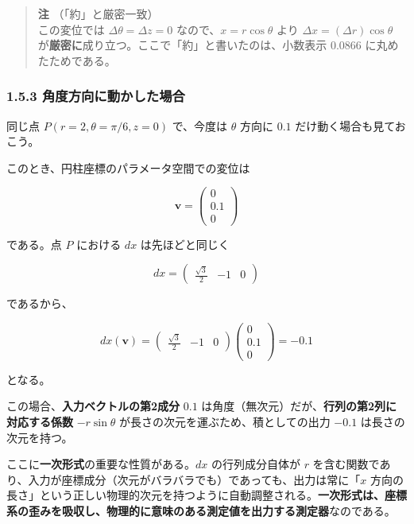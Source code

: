 \documentclass[a4paper,12pt,openany]{book}
\begin{document}
\begin{quote}
\textbf{注} （「約」と厳密一致）\\
この変位では \(\Delta\theta=\Delta z=0\) なので、\(x=r\cos\theta\) より
\(\Delta x=(\Delta r)\cos\theta\)
が\textbf{厳密に}成り立つ。ここで「約」と書いたのは、小数表示 \(0.0866\)
に丸めたためである。
\end{quote}

\hypertarget{ux89d2ux5ea6ux65b9ux5411ux306bux52d5ux304bux3057ux305fux5834ux5408}{%
\subsubsection{1.5.3
角度方向に動かした場合}\label{ux89d2ux5ea6ux65b9ux5411ux306bux52d5ux304bux3057ux305fux5834ux5408}}

同じ点 \(P(r=2,\theta=\pi/6,z=0)\) で、今度は \(\theta\) 方向に \(0.1\)
だけ動く場合も見ておこう。

このとき、円柱座標のパラメータ空間での変位は

\[
\mathbf{v}
=
\begin{pmatrix}
0\\
0.1\\
0
\end{pmatrix}
\]

である。点 \(P\) における \(dx\) は先ほどと同じく

\[
dx
=
\begin{pmatrix}
\frac{\sqrt{3}}{2} & -1 & 0
\end{pmatrix}
\]

であるから、

\[
dx(\mathbf{v})
=
\begin{pmatrix}
\frac{\sqrt{3}}{2} & -1 & 0
\end{pmatrix}
\begin{pmatrix}
0\\
0.1\\
0
\end{pmatrix}
=
-0.1
\]

となる。

この場合、\textbf{入力ベクトルの第2成分} \(0.1\)
は角度（無次元）だが、\textbf{行列の第2列に対応する係数}
\(-r\sin\theta\) が長さの次元を運ぶため、積としての出力 \(-0.1\)
は長さの次元を持つ。

ここに\textbf{一次形式}の重要な性質がある。\(dx\) の行列成分自体が \(r\)
を含む関数であり、入力が座標成分（次元がバラバラでも）であっても、出力は常に「\(x\)
方向の長さ」という正しい物理的次元を持つように自動調整される。\textbf{一次形式は、座標系の歪みを吸収し、物理的に意味のある測定値を出力する測定器}なのである。
\end{document}
